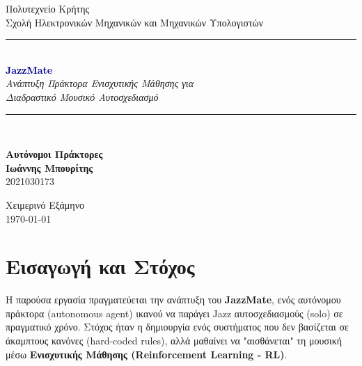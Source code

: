 \documentclass[11pt, a4paper]{article}
\begin{document}
\begin{titlepage}
    \centering
    \vspace*{0.5cm}
    
    {\large \textsf{Πολυτεχνείο Κρήτης}} \\
    {\small \textsf{Σχολή Ηλεκτρονικών Μηχανικών και Μηχανικών Υπολογιστών}} \\
    \vspace{1.5cm}
    
    \vspace{1cm}
    
    \rule{\linewidth}{0.8mm} \\[0.6cm]
    
    {\Huge \bfseries \textcolor{darkblue}{JazzMate}} \\[0.4cm]
    {\Large \textit{Ανάπτυξη Πράκτορα Ενισχυτικής Μάθησης για \\ Διαδραστικό Μουσικό Αυτοσχεδιασμό}} \\[0.6cm]
    
    \rule{\linewidth}{0.8mm} \\
    \vspace{1.5cm}
    
    {\large \textbf{Αυτόνομοι Πράκτορες}} \\
    \vspace{2.5cm}
    \textbf{Ιωάννης Μπουρίτης} \\
            2021030173
    
    \vfill
    
    {\large Χειμερινό Εξάμηνο \\ \today}
    
\end{titlepage}

\newpage
\thispagestyle{empty}
\tableofcontents
\newpage


\section{Εισαγωγή και Στόχος}
Η παρούσα εργασία πραγματεύεται την ανάπτυξη του \textbf{JazzMate}, ενός αυτόνομου πράκτορα (autonomous agent) ικανού να παράγει Jazz αυτοσχεδιασμούς (solo) σε πραγματικό χρόνο. Στόχος ήταν η δημιουργία ενός συστήματος που δεν βασίζεται σε άκαμπτους κανόνες (hard-coded rules), αλλά μαθαίνει να "αισθάνεται" τη μουσική μέσω \textbf{Ενισχυτικής Μάθησης (Reinforcement Learning - RL)}.
\end{document}

